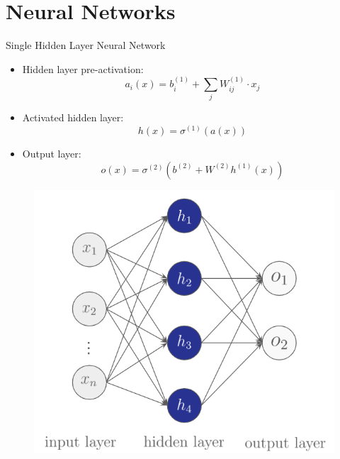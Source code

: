 \documentclass[serif, aspectratio=169]{beamer}
\begin{document}
\section{Neural Networks}
\begin{frame}{Single Hidden Layer Neural Network}
    \begin{itemize}
        \item Hidden layer pre-activation:
        $$a_i(x) = b^{(1)}_i + \sum_j W^{(1)}_{ij} \cdot x_j$$
        \item Activated hidden layer:
        $$h(x) = \sigma^{(1)}(a(x))$$
        \item Output layer:
        $$ o(x) = \sigma^{(2)}\left(b^{(2)} + W^{(2)}h^{(1)}(x) \right) $$
    \end{itemize}
    \endminipage
    \hfill
        \begin{figure}[bh]
            \includegraphics[width=\linewidth]{pic/2/single-hidden_nn.png}
        \end{figure}
    \endminipage
\end{frame}
\end{document}
